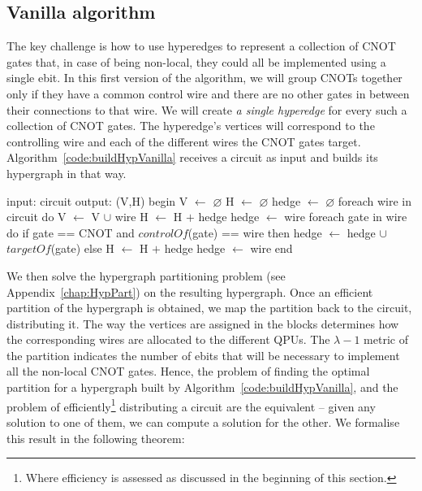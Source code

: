 \subsection{Vanilla algorithm}
\label{Vanilla}

The key challenge is how to use hyperedges to represent a collection of CNOT gates that, in case of being non-local, they could all be implemented using a single ebit. In this first version of the algorithm, we will group CNOTs together only if they have a common control wire and there are no other gates in between their connections to that wire. We will create \textit{a single hyperedge} for every such a collection of CNOT gates. The hyperedge's vertices will correspond to the controlling wire and each of the different wires the CNOT gates target. Algorithm~\ref{code:buildHypVanilla} receives a circuit as input and builds its hypergraph in that way. 

\begin{algorithm}[caption={Builds the hypergraph of a given circuit. \(H\) may contain multiple hyperedges connecting the same vertices. This algorithm runs in time \(O(g)\), where \(g\) is the number of gates in the input circuit.}, label={code:buildHypVanilla}]
input: circuit
output: (V,H)
begin
  V $\gets$ $\varnothing$
  H $\gets$ $\varnothing$
  hedge $\gets$ $\varnothing$
  foreach wire in circuit do
    V $\gets$ V $\cup$ {wire}
    H $\gets$ H $+$ {hedge}
    hedge $\gets$ {wire}
    foreach gate in wire do
      if gate == CNOT and $controlOf$(gate) == wire then
        hedge $\gets$ hedge $\cup$ {$targetOf$(gate)}
      else
        H $\gets$ H $+$ {hedge}
        hedge $\gets$ {wire}
end
\end{algorithm}


We then solve the hypergraph partitioning problem (see Appendix~\ref{chap:HypPart}) on the resulting hypergraph. Once an efficient partition of the hypergraph is obtained, we map the partition back to the circuit, distributing it. The way the vertices are assigned in the blocks determines how the corresponding wires are allocated to the different QPUs. The \(\lambda-1\) metric of the partition indicates the number of ebits that will be necessary to implement all the non-local CNOT gates. Hence, the problem of finding the optimal partition for a hypergraph built by Algorithm~\ref{code:buildHypVanilla}, and the problem of efficiently\footnote{Where efficiency is assessed as discussed in the beginning of this section.} distributing a circuit are the equivalent -- given any solution to one of them, we can compute a solution for the other. We formalise this result in the following theorem:

